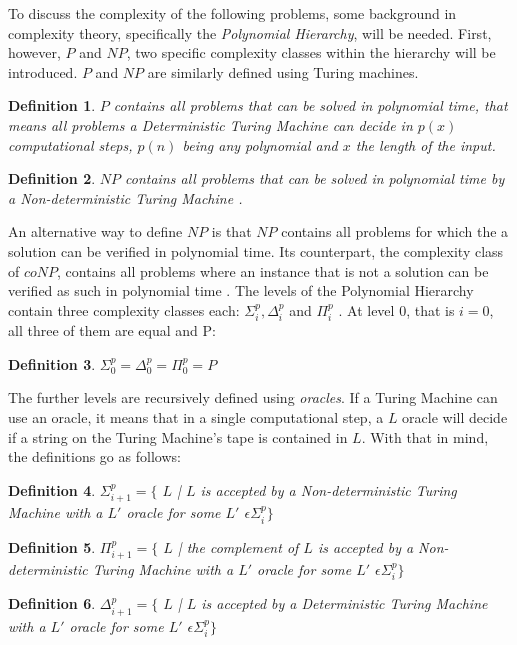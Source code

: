 \documentclass[12pt,a4paper]{article}
\newtheorem{definition}{Definition}
\begin{document}
To discuss the complexity of the following problems, some background in complexity theory, specifically the \textit{Polynomial Hierarchy}, will be needed. First, however, $P$ and $NP$, two specific complexity classes within the hierarchy will be introduced.
\newline
$P$ and $NP$ are similarly defined using Turing machines. 
\begin{definition}
$P$ contains all problems that can be solved in polynomial time, that means all problems a Deterministic Turing Machine can decide in $p(x)$ computational steps, $p(n)$ being any polynomial and $x$ the length of the input.
\end{definition} 
\begin{definition}
$NP$ contains all problems that can be solved in polynomial time by a Non-deterministic Turing Machine \citep{Davis1983}. 
\end{definition} 
An alternative way to define $NP$ is that $NP$ contains all problems for which the a solution can be verified in polynomial time. \citep[p. 59]{Goldreich} Its counterpart, the complexity class of $coNP$, contains all problems where an instance that is not a solution can be verified as such in polynomial time \citep[p. 154-155]{Goldreich}. 
\newline
The levels of the Polynomial Hierarchy contain three complexity classes each: $\Sigma^p_i, \Delta^p_i$ and $\Pi^p_i$ \citep{Meyer1972}. At level 0, that is $i = 0$, all three of them are equal and P: 
\begin{definition}
	$\Sigma^p_0 = \Delta^p_0 = \Pi^p_0 = P $ \citep{Stockmeyer1976}
\end{definition}  
The further levels are recursively defined using \textit{oracles}. If a Turing Machine can use an oracle, it means that in a single computational step, a $L$ oracle will decide if a string on the Turing Machine's tape is contained in $L$. With that in mind, the definitions go as follows:
\begin{definition}
	$\Sigma^p_{i+1} = \{$ $L$ | $L$ is accepted by a Non-deterministic Turing Machine with a $L'$ oracle for some $L'$ $\epsilon \Sigma^p_i\}$
\end{definition}
\begin{definition}
	$\Pi^p_{i+1} = \{$ $L$ | the complement of $L$ is accepted by a Non-deterministic Turing Machine with a $L'$ oracle for some $L'$ $\epsilon \Sigma^p_i\}$
\end{definition}
\begin{definition}
	$\Delta^p_{i+1} = \{$ $L$ | $L$ is accepted by a Deterministic Turing Machine with a $L'$ oracle for some $L'$ $\epsilon \Sigma^p_i\}$
\end{definition}
\end{document}

